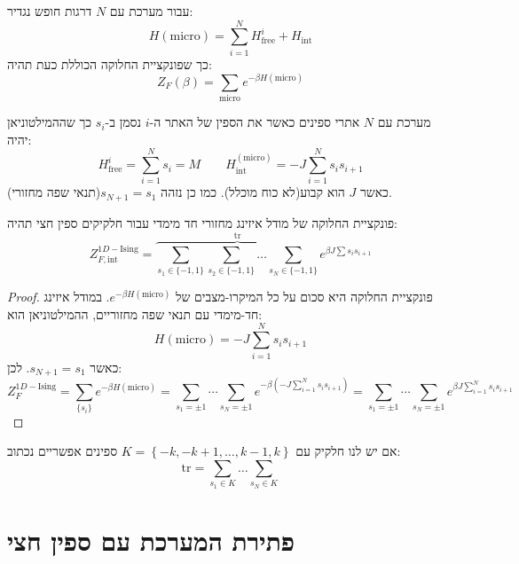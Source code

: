 \documentclass{tstextbook}
\begin{document}
\begin{definition}
עבור מערכת עם \(N\) דרגות חופש נגדיר:
$$H(\text{micro})=\sum_{i=1}^{N} H_{\text{free}}^{i}+H_{\text{int}}$$
כך שפונקציית החלוקה הכוללת כעת תהיה:
$$Z_{F}\left( \beta \right)=\sum_{\text{micro}}e^{ -\beta H\left( \text{micro}
 \right) }$$

\end{definition}
\begin{definition}
מערכת עם \(N\) אתרי ספינים כאשר את הספין של האתר ה-\(i\) נסמן ב-\(s_{i}\) כך שההמילטוניאן יהיה:
$$H_{\text{free}}^{i}=\sum_{i=1}^{N} s_{i}=M\qquad H_{\text{int}}^{\left( \text{micro} \right)}=-J\sum_{i=1}^{N} s_{i}s_{i+1}$$
כאשר \(J\) הוא קבוע(לא כוח מוכלל). כמו כן נזהה \(s_{N+1}=s_{1}\)(תנאי שפה מחזורי).

\end{definition}
\begin{proposition}
פונקציית החלוקה של מודל איזינג מחזורי חד מימדי עבור חלקיקים ספין חצי תהיה:
$$Z ^{1D-\text{Ising}}_{F, \text{int}}= \overbrace{ \sum_{s_{1} \in \{ -1,1 \}}\sum_{s_{2}\in \{ -1,1 \}}\dots \sum_{s_{N}\in \{ -1,1 \}} }^{ \mathrm{tr} } e^{ \beta J\sum s_{i}s_{i+1} }$$

\end{proposition}
\begin{proof}
פונקציית החלוקה היא סכום על כל המיקרו-מצבים של \(e^{-\beta H(\text{micro})}\). במודל איזינג חד-מימדי עם תנאי שפה מחזוריים, ההמילטוניאן הוא:
$$H(\text{micro}) = -J\sum_{i=1}^{N} s_{i}s_{i+1}$$
כאשר \(s_{N+1} = s_1\). לכן:
$$Z^{1D-\text{Ising}}_{F} = \sum_{\{s_i\}} e^{-\beta H(\text{micro})}= \sum_{s_1 = \pm 1} \cdots \sum_{s_N = \pm 1} e^{-\beta \left(-J\sum_{i=1}^{N} s_{i}s_{i+1}\right)}= \sum_{s_1 = \pm 1} \cdots \sum_{s_N = \pm 1} e^{\beta J\sum_{i=1}^{N} s_{i}s_{i+1}}
$$

\end{proof}
\begin{symbolize}
אם יש לנו חלקיק עם \(K=\left\{  -k,-k+1,\dots,k-1,k  \right\}\) ספינים אפשריים נכתוב:
$$\mathrm{tr}=\sum_{s_{1} \in K}\dots \sum_{s_{N}\in K}$$

\end{symbolize}
\section{פתירת המערכת עם ספין חצי}
\end{document}
